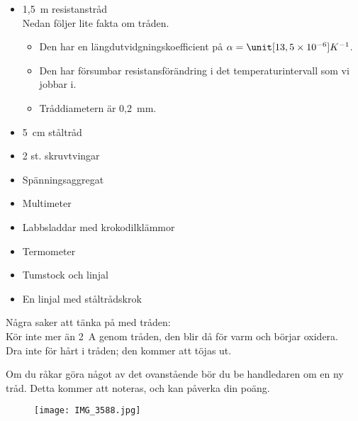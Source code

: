 \documentclass[12pt,a4paper]{article}
\begin{document}
\begin{itemize}
\item 1,5~m resistanstråd\\%
  Nedan följer lite fakta om tråden.
\begin{itemize}
\item Den har en längdutvidgningskoefficient på
  $\alpha=\unit[13,5\times 10^{-6}]{K^{-1}}$.
\item Den har försumbar resistansförändring i det temperaturintervall
  som vi jobbar i.
\item Tråddiametern är 0,2~mm.
\end{itemize}
\item 5~cm ståltråd
\item 2 st. skruvtvingar
\item Spänningsaggregat
\item Multimeter
\item Labbsladdar med krokodilklämmor\footnotemark
\item Termometer
\item Tumstock och linjal
\item En linjal med ståltrådskrok
\end{itemize}
Några saker att tänka på med tråden:\\
Kör inte mer än 2~A genom tråden, den blir då för varm och börjar
oxidera. \\
Dra inte för hårt i tråden; den kommer att töjas ut. 

Om du råkar göra något av det ovanstående bör du be handledaren om en
ny tråd. Detta kommer att noteras, och kan påverka din poäng.

\begin{figure}\centering
\centerline{ %
\texttt{[image: IMG\_3588.jpg]}
}
\end{figure}
\end{document}
